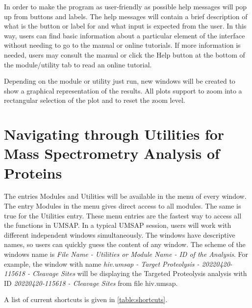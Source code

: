 In order to make the program as user-friendly as possible help messages will pop up
from buttons and labels. The help messages will contain a brief description of what
is the button or label for and what input is expected from the user. In this way, users
can find basic information about a particular element of the interface without needing
to go to the manual or online tutorials. If more information is needed, users may
consult the manual or click the Help button at the bottom of the module/utility tab to
read an online tutorial.

Depending on the module or utility just run, new windows will be created to show a
graphical representation of the results. All plots support to zoom into a rectangular
selection of the plot and to reset the zoom level.

\section{Navigating through Utilities for Mass Spectrometry Analysis of Proteins}

The entries Modules and Utilities will be available in the menu of every window.
The entry Modules in the menu gives direct access to all modules. The same is true for
the Utilities entry. These menu entries are the fastest way to access all the functions
in UMSAP. In a typical UMSAP session, users will work with different independent windows
simultaneously. The windows have descriptive names, so users can quickly guess the content
of any window. The scheme of the windows name is
\textit{File Name - Utilities or Module Name - ID of the Analysis}. For example, the window
with name \textit{hiv.umsap - Target Proteolysis - 20220420-115618 - Cleavage Sites} will be
displaying the Targeted Proteolysis analysis with ID \textit{20220420-115618 - Cleavage Sites} from
file hiv.umsap.

A list of current shortcuts is given in \autoref{table:shortcuts}.

